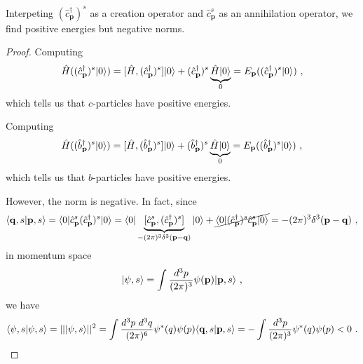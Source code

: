     Interpeting $(\hat c^\dagger_{\mathbf p})^s$ as a creation operator and $\hat c^s_{\mathbf p}$ as an annihilation operator, we find positive energies but negative norms. 
    \begin{proof}
        Computing 
        \begin{equation*}
            \hat H ((\hat c^\dagger_{\mathbf p})^s \vert0\rangle) = [\hat H, (\hat c^\dagger_{\mathbf p})^s] \vert0\rangle + (\hat c^\dagger_{\mathbf p})^s \underbrace{\hat H \vert0\rangle}_0 = E_\mathbf p ((\hat c^\dagger_{\mathbf p})^s \vert0\rangle) ~,
        \end{equation*}
        which tells us that $c$-particles have positive energies.

        Computing 
        \begin{equation*}
            \hat H ((\hat b^\dagger_{\mathbf p})^s \vert0\rangle) = [\hat H, (\hat b^\dagger_{\mathbf p})^s] \vert0\rangle + (\hat b^\dagger_{\mathbf p})^s \underbrace{\hat H \vert0\rangle}_0 = E_\mathbf p ((\hat b^\dagger_{\mathbf p})^s \vert0\rangle) ~,
        \end{equation*}
        which tells us that $b$-particles have positive energies.

        However, the norm is negative. In fact, since
        \begin{equation*}
            \langle\mathbf q, s\vert\mathbf p, s\rangle = \langle0\vert \hat c^s_{\mathbf p} (\hat c^\dagger_{\mathbf p})^s \vert0\rangle = \langle0\vert \underbrace{[\hat c^s_{\mathbf p} , (\hat c^\dagger_{\mathbf p})^s]}_{- (2\pi)^3 \delta^3 (\mathbf p - \mathbf q)} \vert0\rangle + \cancel{\langle0\vert (\hat c^\dagger_{\mathbf p})^s \hat c^s_{\mathbf p} \vert0\rangle} =- (2\pi)^3 \delta^3 (\mathbf p - \mathbf q) ~,
        \end{equation*}
        in momentum space 
        \begin{equation*}
            \vert\psi, s\rangle = \int \frac{d^3 p}{(2\pi)^3} \psi (\mathbf p) \vert\mathbf p, s\rangle ~,
        \end{equation*}
        we have 
        \begin{equation*}
            \langle\psi, s\vert\psi, s\rangle = ||\vert\psi, s\rangle||^2 = \int \frac{d^3 p ~ d^3 q}{(2\pi)^6} \psi^* \mathbf(q) \psi \mathbf(p) \langle\mathbf q, s\vert\mathbf p, s\rangle = - \int \frac{d^3 p}{(2\pi)^3} \psi^* \mathbf(q) \psi \mathbf(p) < 0 ~.
        \end{equation*}
    \end{proof}


